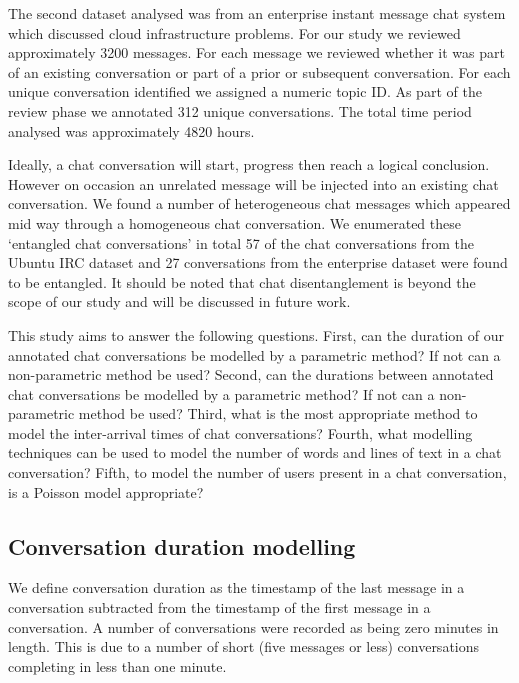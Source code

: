 The second dataset analysed was from an enterprise instant message chat system which discussed cloud infrastructure problems. For our study we reviewed approximately 3200 messages. For each message we reviewed whether it was part of an existing conversation or part of a prior or subsequent conversation. For each unique conversation identified we assigned a numeric topic ID. As part of the review phase we annotated 312 unique conversations. The total time period analysed was approximately 4820 hours. 

Ideally, a chat conversation will start, progress then reach a logical conclusion. However on occasion an unrelated message will be injected into an existing chat conversation. We found a number of heterogeneous chat messages which appeared mid way through a homogeneous chat conversation. We enumerated these `entangled chat conversations' \cite{elsner2010disentangling} in total 57 of the chat conversations from the Ubuntu IRC dataset and 27 conversations from the enterprise dataset were found to be entangled. It should be noted that chat disentanglement is beyond the scope of our study and will be discussed in future work.

This study aims to answer the following questions. First, can the duration of our annotated chat conversations be modelled by a parametric method? If not can a non-parametric method be used? Second, can the durations between annotated chat conversations be modelled by a parametric method? If not can a non-parametric method be used? Third, what is the most appropriate method to model the inter-arrival times of chat conversations? Fourth, what modelling techniques can be used to model the number of words and lines of text in a chat conversation? Fifth, to model the number of users present in a chat conversation, is a Poisson model appropriate?

\subsection{Conversation duration modelling}

We define conversation duration as the timestamp of the last message in a conversation subtracted from the timestamp of the first message in a conversation. A number of conversations were recorded as being zero minutes in length. This is due to a number of short (five messages or less) conversations completing in less than one minute. 



